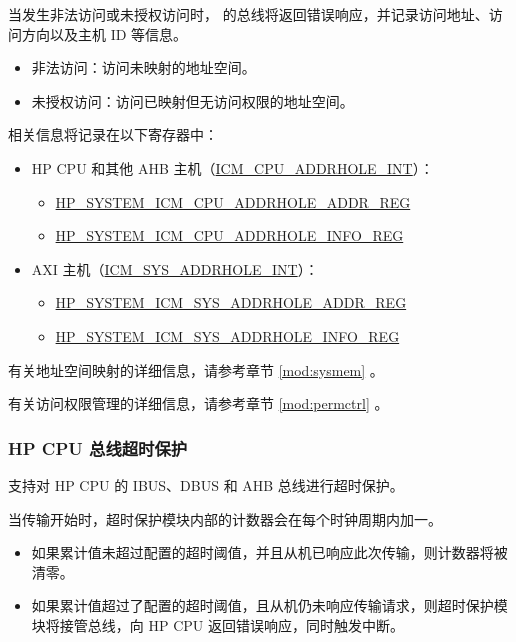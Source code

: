 \documentclass[main\_\_CN.tex]{subfiles}
\begin{document}
当发生非法访问或未授权访问时，\chipname{} 的总线将返回错误响应，并记录访问地址、访问方向以及主机 ID 等信息。

\begin{itemize}
    \item 非法访问：访问未映射的地址空间。
    \item 未授权访问：访问已映射但无访问权限的地址空间。
\end{itemize}

相关信息将记录在以下寄存器中：

\begin{itemize}
    \item HP CPU 和其他 AHB 主机（\hyperref[tab:sysreg-int-sources]{ICM\_CPU\_ADDRHOLE\_INT}）：
    \begin{itemize}
        \item \hyperref[regdesc:HPSYSTEMICMCPUADDRHOLEADDRREG]{HP\_SYSTEM\_ICM\_CPU\_ADDRHOLE\_ADDR\_REG}
        \item \hyperref[regdesc:HPSYSTEMICMCPUADDRHOLEINFOREG]{HP\_SYSTEM\_ICM\_CPU\_ADDRHOLE\_INFO\_REG}
    \end{itemize}
    \item AXI 主机（\hyperref[tab:sysreg-int-sources]{ICM\_SYS\_ADDRHOLE\_INT}）：
    \begin{itemize}
        \item \hyperref[regdesc:HPSYSTEMICMSYSADDRHOLEADDRREG]{HP\_SYSTEM\_ICM\_SYS\_ADDRHOLE\_ADDR\_REG}
        \item \hyperref[regdesc:HPSYSTEMICMSYSADDRHOLEINFOREG]{HP\_SYSTEM\_ICM\_SYS\_ADDRHOLE\_INFO\_REG}
    \end{itemize}
\end{itemize}

有关地址空间映射的详细信息，请参考章节 \ref{mod:sysmem} \textit{}。

有关访问权限管理的详细信息，请参考章节 \ref{mod:permctrl} \textit{}。


\subsubsection{HP CPU 总线超时保护}

\chipname{} 支持对 HP CPU 的 IBUS、DBUS 和 AHB 总线进行超时保护。

当传输开始时，超时保护模块内部的计数器会在每个时钟周期内加一。

\begin{itemize}
    \item 如果累计值未超过配置的超时阈值，并且从机已响应此次传输，则计数器将被清零。
    \item 如果累计值超过了配置的超时阈值，且从机仍未响应传输请求，则超时保护模块将接管总线，向 HP CPU 返回错误响应，同时触发中断。
\end{itemize}
\end{document}
